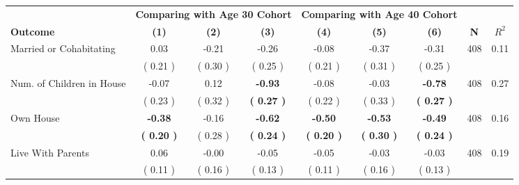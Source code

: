 \begin{tabular}{lcccccccc}
\toprule
 & \multicolumn{3}{c}{\textbf{Comparing with Age 30 Cohort}} & \multicolumn{3}{c}{\textbf{Comparing with Age 40 Cohort}} & \\
\cmidrule(lr){2-4} \cmidrule(lr){5-7} 
 \textbf{Outcome} & \textbf{(1)} & \textbf{(2)} & \textbf{(3)} & \textbf{(4)} & \textbf{(5)} & \textbf{(6)} & \textbf{N} & \textbf{$ R^2$} \\
\midrule
Married or Cohabitating &      0.03 &     -0.21 &     -0.26 &     -0.08 &     -0.37 &     -0.31 & 408 &       0.11 \\ 
 & (     0.21 ) & (     0.30 ) & (     0.25 ) & (     0.21 ) & (     0.31 ) & (     0.25 ) & \\
Num. of Children in House &     -0.07 &      0.12 & \textbf{    -0.93} &     -0.08 &     -0.03 & \textbf{    -0.78} & 408 &       0.27 \\ 
 & (     0.23 ) & (     0.32 ) & \textbf{(     0.27 )} & (     0.22 ) & (     0.33 ) & \textbf{(     0.27 )} & \\
Own House & \textbf{    -0.38} &     -0.16 & \textbf{    -0.62} & \textbf{    -0.50} & \textbf{    -0.53} & \textbf{    -0.49} & 408 &       0.16 \\ 
 & \textbf{(     0.20 )} & (     0.28 ) & \textbf{(     0.24 )} & \textbf{(     0.20 )} & \textbf{(     0.30 )} & \textbf{(     0.24 )} & \\
Live With Parents &      0.06 &     -0.00 &     -0.05 &     -0.05 &     -0.03 &     -0.03 & 408 &       0.19 \\ 
 & (     0.11 ) & (     0.16 ) & (     0.13 ) & (     0.11 ) & (     0.16 ) & (     0.13 ) & \\
\bottomrule
\end{tabular}
